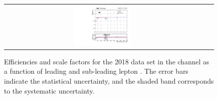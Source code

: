 \begin{figure}[!htb]
\begin{center}
\begin{tabular}{ccc}
      \includegraphics[width=0.30\textwidth]{fig_2018_TrigSF/g_ee_lepBpt_FullSystUncBand.pdf}\\
    \end{tabular}
    \caption{Efficiencies and scale factors for the 2018 data set in the \ee channel as a function of leading and sub-leading lepton \pT.
            The error bars indicate the statistical uncertainty, and the shaded band corresponds to the systematic uncertainty.
            }
    \label{TrigSF_2018_2}
  \end{center}
\end{figure}

